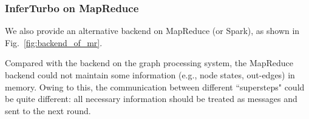 \documentclass[conference]{IEEEtran}
\begin{document}
\subsubsection{InferTurbo on MapReduce}
We also provide an alternative backend on MapReduce (or Spark), as shown in Fig.~\ref{fig:backend_of_mr}.

Compared with the backend on the graph processing system, the MapReduce backend could not maintain some information (e.g., node states, out-edges) in memory.
Owing to this, the communication between different ``supersteps" could be quite different: all necessary information should be treated as messages and sent to the next round.
\end{document}
